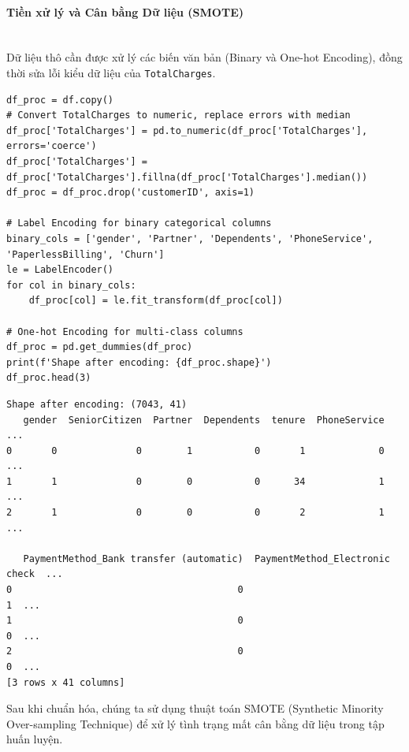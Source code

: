 \paragraph{Tiền xử lý và Cân bằng Dữ liệu (SMOTE)} \hfill \\

Dữ liệu thô cần được xử lý các biến văn bản (Binary và One-hot Encoding), đồng thời sửa lỗi kiểu dữ liệu của \texttt{TotalCharges}.

\begin{lstlisting}[style=pythoncode, caption={Tiền xử lý chuỗi ký tự và mã hóa phân loại}]
df_proc = df.copy()
# Convert TotalCharges to numeric, replace errors with median
df_proc['TotalCharges'] = pd.to_numeric(df_proc['TotalCharges'], errors='coerce')
df_proc['TotalCharges'] = df_proc['TotalCharges'].fillna(df_proc['TotalCharges'].median())
df_proc = df_proc.drop('customerID', axis=1)

# Label Encoding for binary categorical columns
binary_cols = ['gender', 'Partner', 'Dependents', 'PhoneService', 'PaperlessBilling', 'Churn']
le = LabelEncoder()
for col in binary_cols:
    df_proc[col] = le.fit_transform(df_proc[col])

# One-hot Encoding for multi-class columns
df_proc = pd.get_dummies(df_proc)
print(f'Shape after encoding: {df_proc.shape}')
df_proc.head(3)
\end{lstlisting}

\begin{lstlisting}[style=consoleoutput, caption={Hình dáng dữ liệu sau khi mã hóa One-hot}]
Shape after encoding: (7043, 41)
   gender  SeniorCitizen  Partner  Dependents  tenure  PhoneService  ...
0       0              0        1           0       1             0  ...
1       1              0        0           0      34             1  ...
2       1              0        0           0       2             1  ...

   PaymentMethod_Bank transfer (automatic)  PaymentMethod_Electronic check  ...
0                                        0                               1  ...
1                                        0                               0  ...
2                                        0                               0  ...
[3 rows x 41 columns]
\end{lstlisting}

Sau khi chuẩn hóa, chúng ta sử dụng thuật toán SMOTE (Synthetic Minority Over-sampling Technique) để xử lý tình trạng mất cân bằng dữ liệu trong tập huấn luyện.

